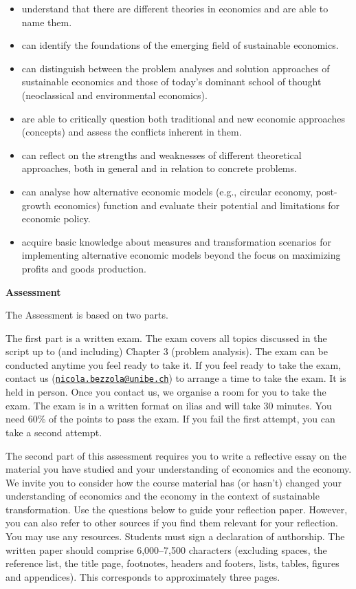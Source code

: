 \documentclass[
  british,
  a4paper,
  DIV=11,
  numbers=noendperiod,
  oneside,
  openany]{scrreprt}
\providecommand{\tightlist}{%
  \setlength{\itemsep}{0pt}\setlength{\parskip}{0pt}}
\begin{document}
\begin{itemize}
\tightlist
\item
  understand that there are different theories in economics and are able
  to name them.
\item
  can identify the foundations of the emerging field of sustainable
  economics.
\item
  can distinguish between the problem analyses and solution approaches
  of sustainable economics and those of today's dominant school of
  thought (neoclassical and environmental economics).
\item
  are able to critically question both traditional and new economic
  approaches (concepts) and assess the conflicts inherent in them.
\item
  can reflect on the strengths and weaknesses of different theoretical
  approaches, both in general and in relation to concrete problems.
\item
  can analyse how alternative economic models (e.g., circular economy,
  post-growth economics) function and evaluate their potential and
  limitations for economic policy.
\item
  acquire basic knowledge about measures and transformation scenarios
  for implementing alternative economic models beyond the focus on
  maximizing profits and goods production.
\end{itemize}

\textbf{Assessment}

The Assessment is based on two parts.

The first part is a written exam. The exam covers all topics discussed
in the script up to (and including) Chapter 3 (problem analysis). The
exam can be conducted anytime you feel ready to take it. If you feel
ready to take the exam, contact us
(\href{mailto:nicola.bezzola@unibe.ch}{\nolinkurl{nicola.bezzola@unibe.ch}})
to arrange a time to take the exam. It is held in person. Once you
contact us, we organise a room for you to take the exam. The exam is in
a written format on ilias and will take 30 minutes. You need 60\% of the
points to pass the exam. If you fail the first attempt, you can take a
second attempt.

The second part of this assessment requires you to write a reflective
essay on the material you have studied and your understanding of
economics and the economy. We invite you to consider how the course
material has (or hasn't) changed your understanding of economics and the
economy in the context of sustainable transformation. Use the questions
below to guide your reflection paper. However, you can also refer to
other sources if you find them relevant for your reflection. You may use
any resources. Students must sign a declaration of authorship. The
written paper should comprise 6,000--7,500 characters (excluding spaces,
the reference list, the title page, footnotes, headers and footers,
lists, tables, figures and appendices). This corresponds to
approximately three pages.
\end{document}
